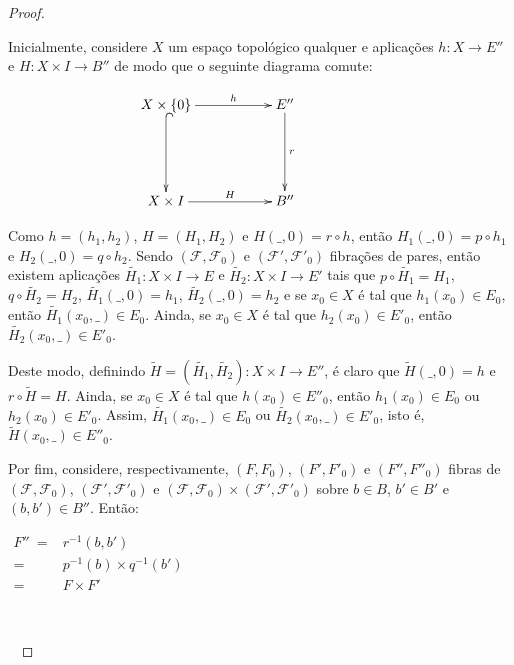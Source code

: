 \documentclass[12pt,oneside]{book} %
\newcommand{\wt}{\widetilde}
\begin{document}
\begin{proof}
	
	\
	
	\par Inicialmente, considere $X$ um espaço topológico qualquer e aplicações $h:X\to E''$ e $H:X\times I\to B''$ de modo que o seguinte diagrama comute:
	
	$$\xymatrix @C=0.5cm {
		X\times\{ 0 \} \ar[rrr]^-{h} \ar@{^(->}[dd] &&& E'' \ar[dd]^-{r} \\
		&&& &&& \\
		X\times I \ar[rrr]^-{H} &&& B'' 
	}$$
	
	\par Como $h=(h_{1},h_{2})$, $H=(H_{1},H_{2})$ e $H(\_,0)=r\circ h$, então $H_{1}(\_,0)=p\circ h_{1}$ e $H_{2}(\_,0)=q\circ h_{2}$. Sendo $(\mathcal{F},\mathcal{F}_{0})$ e $(\mathcal{F'},\mathcal{F'}_{0})$ fibrações de pares, então existem aplicações $\wt{H_{1}}:X\times I\to E$ e $\wt{H_{2}}:X\times I\to E'$ tais que $p\circ\wt{H_{1}}=H_{1}$, $q\circ\wt{H_{2}}=H_{2}$, $\wt{H_{1}}(\_,0)=h_{1}$, $\wt{H_{2}}(\_,0)=h_{2}$ e se $x_{0}\in X$ é tal que $h_{1}(x_{0})\in E_{0}$, então $\wt{H_{1}}(x_{0},\_)\in E_{0}$. Ainda, se $x_{0}\in X$ é tal que $h_{2}(x_{0})\in E'_{0}$, então $\wt{H_{2}}(x_{0},\_)\in E'_{0}$.
	
	\par Deste modo, definindo $\wt{H}=(\wt{H_{1}},\wt{H_{2}}):X\times I\to E''$, é claro que $\wt{H}(\_,0)=h$ e $r\circ\wt{H}=H$. Ainda, se $x_{0}\in X$ é tal que $h(x_{0})\in E''_{0}$, então $h_{1}(x_{0})\in E_{0}$ ou $h_{2}(x_{0})\in E'_{0}$. Assim, $\wt{H_{1}}(x_{0},\_)\in E_{0}$ ou $\wt{H_{2}}(x_{0},\_)\in E'_{0}$, isto é, $\wt{H}(x_{0},\_)\in E''_{0}$.
	
	\par Por fim, considere, respectivamente, $(F,F_{0})$, $(F',F'_{0})$ e $(F'',F''_{0})$ fibras de $(\mathcal{F},\mathcal{F}_{0})$, $(\mathcal{F'},\mathcal{F'}_{0})$ e $(\mathcal{F},\mathcal{F}_{0})\times (\mathcal{F'},\mathcal{F'}_{0})$ sobre $b\in B$, $b'\in B'$ e $(b,b')\in B''$. Então: \newline
	
	$\begin{array}{rl}
		F'' \ = & r^{-1}(b,b') \\
		= & p^{-1}(b)\times q^{-1}(b') \\
		= & F\times F'
	\end{array}$
	
	\
	
	\
	

\end{proof}
\end{document}

